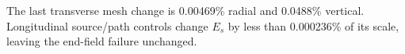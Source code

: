 The last transverse mesh change is 0.00469\% radial and 0.0488\% vertical. Longitudinal source/path controls change $E_s$ by less than 0.000236\% of its scale, leaving the end-field failure unchanged.
